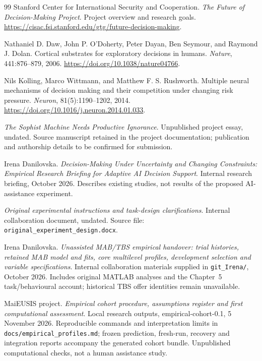 \documentclass[11pt,a4paper]{article}
\begin{document}
\begingroup
\small
\begin{thebibliography}{99}
Stanford Center for International Security and Cooperation. \emph{The Future of Decision-Making Project}. Project overview and research goals. \url{https://cisac.fsi.stanford.edu/gtg/future-decision-making}.

Nathaniel D. Daw, John P. O'Doherty, Peter Dayan, Ben Seymour, and Raymond J. Dolan. Cortical substrates for exploratory decisions in humans. \emph{Nature}, 441:876--879, 2006. \url{https://doi.org/10.1038/nature04766}.

Nils Kolling, Marco Wittmann, and Matthew F. S. Rushworth. Multiple neural mechanisms of decision making and their competition under changing risk pressure. \emph{Neuron}, 81(5):1190--1202, 2014. \url{https://doi.org/10.1016/j.neuron.2014.01.033}.

\emph{The Sophist Machine Needs Productive Ignorance}. Unpublished project essay, undated. Source manuscript retained in the project documentation; publication and authorship details to be confirmed for submission.

Irena Danilovska. \emph{Decision-Making Under Uncertainty and Changing Constraints: Empirical Research Briefing for Adaptive AI Decision Support}. Internal research briefing, October 2026. Describes existing studies, not results of the proposed AI-assistance experiment.

\emph{Original experimental instructions and task-design clarifications}. Internal collaboration document, undated. Source file: \texttt{original\_experiment\_design.docx}.

Irena Danilovska. \emph{Unassisted MAB/TBS empirical handover: trial histories, retained MAB model and fits, core multilevel profiles, development selection and variable specifications}. Internal collaboration materials supplied in \texttt{git\_Irena/}, October 2026. Includes original MATLAB analyses and the Chapter~5 task/behavioural account; historical TBS offer identities remain unavailable.

MaiEUSIS project. \emph{Empirical cohort procedure, assumptions register and first computational assessment}. Local research outputs, empirical-cohort-0.1, 5 November 2026. Reproducible commands and interpretation limits in \texttt{docs/empirical\_profiles.md}; frozen prediction, fresh-run, recovery and integration reports accompany the generated cohort bundle. Unpublished computational checks, not a human assistance study.


\end{thebibliography}
\end{document}
